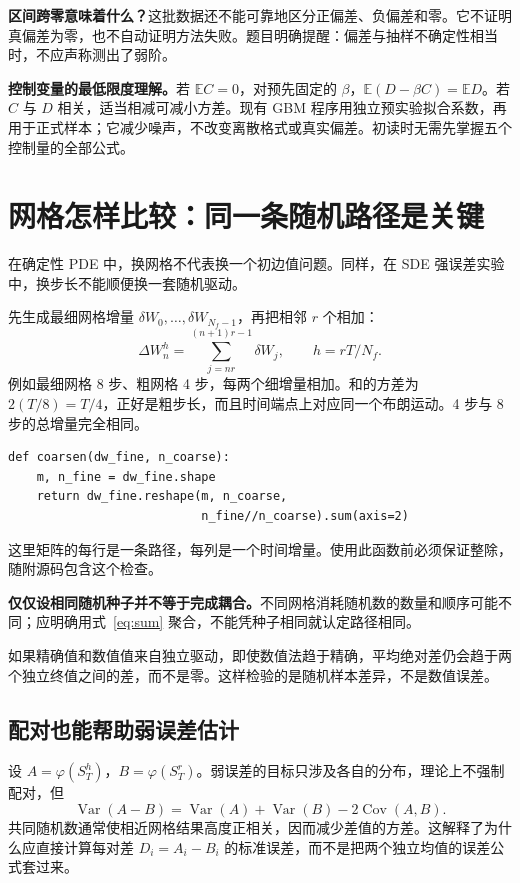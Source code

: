 \documentclass[11pt,a4paper,fontset=none]{ctexart}
\newcommand{\E}{\mathbb E}
\newcommand{\Var}{\operatorname{Var}}
\newcommand{\Cov}{\operatorname{Cov}}
\begin{document}
\textbf{区间跨零意味着什么？}这批数据还不能可靠地区分正偏差、负偏差和零。它不证明真偏差为零，也不自动证明方法失败。题目明确提醒：偏差与抽样不确定性相当时，不应声称测出了弱阶。

\textbf{控制变量的最低限度理解。}若 $\E C=0$，对预先固定的 $\beta$，$\E(D-\beta C)=\E D$。若 $C$ 与 $D$ 相关，适当相减可减小方差。现有 GBM 程序用独立预实验拟合系数，再用于正式样本；它减少噪声，不改变离散格式或真实偏差。初读时无需先掌握五个控制量的全部公式。

\newpage
\section{网格怎样比较：同一条随机路径是关键}\label{sec:coupling}
在确定性 PDE 中，换网格不代表换一个初边值问题。同样，在 SDE 强误差实验中，换步长不能顺便换一套随机驱动。

先生成最细网格增量 $\delta W_0,\ldots,\delta W_{N_f-1}$，再把相邻 $r$ 个相加：
\begin{equation}\label{eq:sum}
\Delta W_n^{h}=\sum_{j=nr}^{(n+1)r-1}\delta W_j,
\qquad h=rT/N_f.
\end{equation}
例如最细网格 8 步、粗网格 4 步，每两个细增量相加。和的方差为 $2(T/8)=T/4$，正好是粗步长，而且时间端点上对应同一个布朗运动。4 步与 8 步的总增量完全相同。

\begin{lstlisting}
def coarsen(dw_fine, n_coarse):
    m, n_fine = dw_fine.shape
    return dw_fine.reshape(m, n_coarse,
                           n_fine//n_coarse).sum(axis=2)
\end{lstlisting}
这里矩阵的每行是一条路径，每列是一个时间增量。使用此函数前必须保证整除，随附源码包含这个检查。

\textbf{仅仅设相同随机种子并不等于完成耦合。}不同网格消耗随机数的数量和顺序可能不同；应明确用式~\eqref{eq:sum} 聚合，不能凭种子相同就认定路径相同。

如果精确值和数值值来自独立驱动，即使数值法趋于精确，平均绝对差仍会趋于两个独立终值之间的差，而不是零。这样检验的是随机样本差异，不是数值误差。

\subsection*{配对也能帮助弱误差估计}
设 $A=\varphi(S_T^h)$，$B=\varphi(S_T^r)$。弱误差的目标只涉及各自的分布，理论上不强制配对，但
\[
\Var(A-B)=\Var(A)+\Var(B)-2\Cov(A,B).
\]
共同随机数通常使相近网格结果高度正相关，因而减少差值的方差。这解释了为什么应直接计算每对差 $D_i=A_i-B_i$ 的标准误差，而不是把两个独立均值的误差公式套过来。
\end{document}
